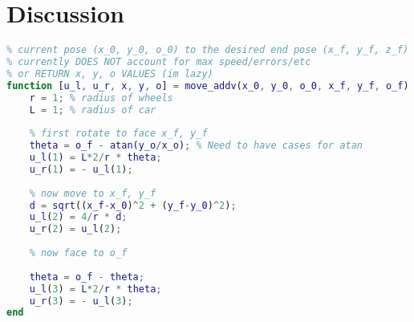 \documentclass[journal]{IEEEtran}
\begin{document}
\section{Discussion}


\ifCLASSOPTIONcaptionsoff
  \newpage
\fi



\newpage
\appendix
\begin{lstlisting}[language = MATLAB]
% returns controls and positions to move from the 
% current pose (x_0, y_0, o_0) to the desired end pose (x_f, y_f, z_f)
% currently DOES NOT account for max speed/errors/etc
% or RETURN x, y, o VALUES (im lazy)
function [u_l, u_r, x, y, o] = move_addv(x_0, y_0, o_0, x_f, y_f, o_f)
    r = 1; % radius of wheels
    L = 1; % radius of car
    
    % first rotate to face x_f, y_f 
    theta = o_f - atan(y_o/x_o); % Need to have cases for atan
    u_l(1) = L*2/r * theta;
    u_r(1) = - u_l(1);
    
    % now move to x_f, y_f
    d = sqrt((x_f-x_0)^2 + (y_f-y_0)^2);
    u_l(2) = 4/r * d;
    u_r(2) = u_l(2);
    
    % now face to o_f
    
    theta = o_f - theta;
    u_l(3) = L*2/r * theta;
    u_r(3) = - u_l(3);
end
\end{lstlisting}
\end{document}
